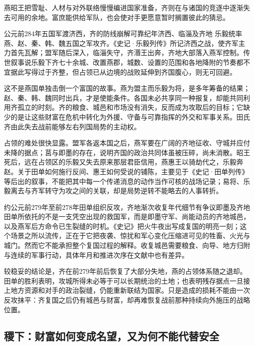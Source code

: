 燕昭王把雪耻、人材与对外联络慢慢编进国家准备，齐则在与诸国的竞逐中逐渐失去可用的余地。富庶能供给军队，也会使对手更愿意暂时搁置彼此的猜忌。

\begin{event}{公元前284年}{五国军渡济西，齐的防线崩解}{可靠纪年}{济西、临淄及齐地}
乐毅统率燕、赵、秦、韩、魏五国之军攻齐。《史记·乐毅列传》所记济西之战，使齐军主力首先瓦解；盟军随后深入，临淄失守，齐湣王出奔，齐地大部落入燕军控制。传世叙事说乐毅下齐七十余城、改置燕郡，城数、设置的范围和各地降附的节奏都不宜据此写得过于齐整，但占领已从边境的战败延伸到齐国腹心，则无可回避。

这不是燕国单独击倒一个富国的故事。燕为盟主而乐毅为将，是多年筹备的结果；赵、秦、韩、魏同时出兵，才是使能条件。各国未必共享同一种报复，却能共同利用齐孤立的时刻。齐的粮食、城邑和市场没有消失，反而成为攻取后的目标；它缺少的是让这些财富在危机中转化为外援、守备与可靠指挥的外交和军事关系。田氏齐由此失去战前能够左右列国局势的主动权。
\end{event}

占领的难处很快显露。盟军各返本国之后，燕军要在广阔的齐地征收、守城并应付未降的据点；莒与即墨的存在，说明齐国的政治共同体虽被压碎，尚未消散。昭王死后，远在占领区的乐毅又失去原来那层君臣信用，燕惠王以骑劫代之，乐毅奔赵。关于田单如何施行反间、惠王如何受说的铺陈，主要见于《史记·田单列传》等后出的叙事，不能把其中每一个传递消息的动作当作可核的战场记录；易将、乐毅离去与齐军转守为攻之间的关联，却是局势逆转不能略去的人事转折。

\begin{event}{约公元前279年至前278年}{田单组织反攻，齐地渐次收复}{年代细节有争议}{即墨及齐地}
田单所依托的不是一支凭空出现的救国军，而是即墨守军、尚能动员的齐地城邑，以及燕军后方命令已生裂缝的时机。《史记》把火牛夜出写成复国的明亮一刻；这个场景之所以流传，正在于它把夜袭、惊扰和军心变化压缩进可见的牲畜、火光与城门。然而它不能承担整个复国过程的解释。收复城邑需要粮食、向导、地方归附与连续的军事行动，具体年月和推进次序在文献中也有差异。

较稳妥的结论是，齐在前279年前后恢复了大部分失地，燕的占领体系随之退却。田单的胜利表明，攻城所得未必等于可以长期统治的土地；也表明残存据点一旦接上地方资源和对手的政治裂缝，仍能重新联结为国家。只是造成的损耗不能由一次反攻抹平：齐复国之后仍有城邑与财富，却再难恢复战前那种持续向外施压的战略位置。
\end{event}

\subsection{稷下：财富如何变成名望，又为何不能代替安全}

